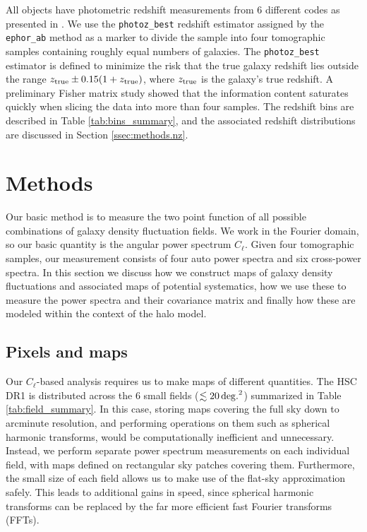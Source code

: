 \documentclass[a4paper,11pt]{article}
\begin{document}
  All objects have photometric redshift measurements from 6 different codes as presented in \cite{2018PASJ...70S...9T}. We use the {\tt photoz\_best} redshift estimator assigned by the {\tt ephor\_ab} method as a marker to divide the sample into four tomographic samples containing roughly equal numbers of galaxies. The {\tt photoz\_best} estimator is defined to minimize the risk that the true galaxy redshift lies outside the range $z_{\rm true}\pm 0.15(1+z_{\rm true})$, where $z_{\rm true}$ is the galaxy's true redshift. A preliminary Fisher matrix study showed that the information content saturates quickly when slicing the data into more than four samples. The redshift bins are described in Table \ref{tab:bins_summary}, and the associated redshift distributions are discussed in Section \ref{ssec:methods.nz}.

\section{Methods}\label{sec:methods}

Our basic method is to measure the two point function of all possible combinations of galaxy density fluctuation fields. We work in the Fourier domain, so our basic quantity is the angular power spectrum $C_\ell$. Given four tomographic samples, our measurement consists of four auto power spectra and six cross-power spectra. In this section we discuss how we construct maps of galaxy density fluctuations and associated maps of potential systematics, how we use these to measure the power spectra and their covariance matrix and finally how these are modeled within the context of the halo model.


  \subsection{Pixels and maps}\label{ssec:methods.pix}
    Our $C_\ell$-based analysis requires us to make maps of different quantities. The HSC DR1 is distributed across the 6 small fields ($\lesssim20\,{\rm deg.}^2$) summarized in Table \ref{tab:field_summary}. In this case, storing maps covering the full sky down to arcminute resolution, and performing operations on them such as spherical harmonic transforms, would be computationally inefficient and unnecessary. Instead, we perform separate power spectrum measurements on each individual field, with maps defined on rectangular sky patches covering them. Furthermore, the small size of each field allows us to make use of the flat-sky approximation safely. This leads to additional gains in speed, since spherical harmonic transforms can be replaced by the far more efficient fast Fourier transforms (FFTs).
    
\end{document}
